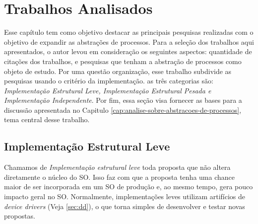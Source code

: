 \chapter{Trabalhos Analisados}
\label{cap:trabalhos-analisados}


Esse capítulo tem como objetivo destacar as principais pesquisas  realizadas com
o objetivo de expandir as abstrações de processos. Para a seleção dos trabalhos
aqui apresentados, o autor levou em consideração os seguintes aspectos:
quantidade de citações dos trabalhos,  e
pesquisas que tenham a abstração de processos como objeto de estudo. Por uma
questão organização, esse trabalho subdivide as pesquisas usando o critério da
implementação.  as três categorias são:
\textit{Implementação Estrutural Leve, Implementação Estrutural Pesada e
Implementação Independente}. Por fim, essa seção visa fornecer as bases para a
discussão apresentada no Capitulo
\ref{cap:analise-sobre-abstracoes-de-processos}, tema central desse trabalho.

\section{Implementação Estrutural Leve}

Chamamos de \textit{Implementação estrutural leve} toda proposta que não altera
diretamente o núcleo do SO. Isso faz com que a proposta tenha uma chance maior
de ser incorporada em um SO de produção e, ao mesmo tempo, gera
pouco impacto geral no SO. Normalmente, implementações leves utilizam
artifícios de \emph{device drivers} (Veja \ref{sec:dd}), o que torna simples de
desenvolver e testar novas propostas.

